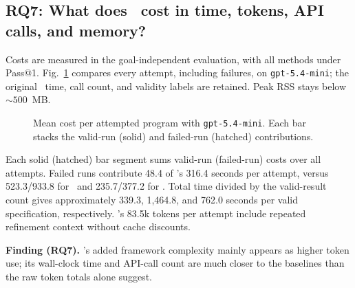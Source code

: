 
\subsection{RQ7: What does \toolname\ cost in time, tokens, API calls, and memory?}
\label{subsec:rq7-cost}

Costs are measured in the goal-independent evaluation, with all methods
under Pass@1. {Fig.~\ref{fig:rq7-cost} compares every attempt, including
failures, on \texttt{gpt-5.4-mini}; the original \autospec\ time, call count,
and validity labels are retained.} Peak RSS stays below \(\sim 500\)~MB.

\begin{figure}[t]
\centering

\caption{{Mean cost per attempted program with \texttt{gpt-5.4-mini}. Each bar stacks the valid-run (solid) and failed-run (hatched) contributions.}}
\label{fig:rq7-cost}
\end{figure}

{Each solid (hatched) bar segment sums valid-run (failed-run) costs over
all attempts. Failed runs contribute 48.4 of \toolname's 316.4 seconds
per attempt, versus 523.3/933.8 for \autospec\ and 235.7/377.2 for
\specgen. Total time divided by the valid-result count gives approximately 339.3, 1,464.8, and 762.0 seconds per valid specification, respectively. \toolname's 83.5k tokens per attempt include
repeated refinement context without cache discounts.}

\begin{finding}
\textbf{Finding (RQ7).} {\toolname's added framework complexity mainly appears as higher token use; its wall-clock time and API-call count are much closer to the baselines than the raw token totals alone suggest.}
\end{finding}
